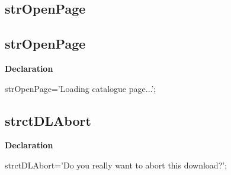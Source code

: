 \documentclass{report}
\newif\ifpdf
\begin{document}
\subsection*{\large{\textbf{strOpenPage}}\normalsize\hspace{1ex}\hrulefill}
\else
\subsection*{strOpenPage}
\fi
\label{trstrings-strOpenPage}
\begin{list}{}{
\setlength{\itemindent}{0cm}
\setlength{\listparindent}{0cm}
\setlength{\leftmargin}{\evensidemargin}
\addtolength{\leftmargin}{\tmplength}
\settowidth{\labelsep}{X}
\addtolength{\leftmargin}{\labelsep}
\setlength{\labelwidth}{\tmplength}
}
\item[\textbf{Declaration}\hfill]
\ifpdf
\begin{flushleft}
\fi
\begin{ttfamily}
strOpenPage='Loading catalogue page...';\end{ttfamily}

\ifpdf
\end{flushleft}
\fi

\end{list}
\ifpdf
\subsection*{\large{\textbf{strctDLAbort}}\normalsize\hspace{1ex}\hrulefill}
\else
\subsection*{strctDLAbort}
\fi
\label{trstrings-strctDLAbort}
\begin{list}{}{
\setlength{\itemindent}{0cm}
\setlength{\listparindent}{0cm}
\setlength{\leftmargin}{\evensidemargin}
\addtolength{\leftmargin}{\tmplength}
\settowidth{\labelsep}{X}
\addtolength{\leftmargin}{\labelsep}
\setlength{\labelwidth}{\tmplength}
}
\item[\textbf{Declaration}\hfill]
\ifpdf
\begin{flushleft}
\fi
\begin{ttfamily}
strctDLAbort='Do you really want to abort this download?';\end{ttfamily}

\ifpdf
\end{flushleft}
\fi

\end{list}
\ifpdf
\end{document}
